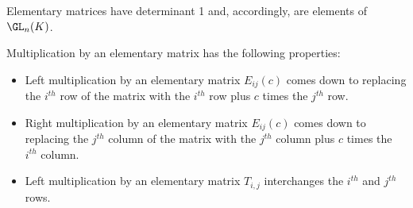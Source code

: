     \begin{property}[Invertibility]
        Elementary matrices have determinant 1 and, accordingly, are elements of $\GL_n(K)$.
    \end{property}
    \begin{property}
        Multiplication by an elementary matrix has the following properties:
        \begin{itemize}
            \item Left multiplication by an elementary matrix $E_{ij}(c)$ comes down to replacing the $i^{th}$ row of the matrix with the $i^{th}$ row plus $c$ times the $j^{th}$ row.
            \item Right multiplication by an elementary matrix $E_{ij}(c)$ comes down to replacing the $j^{th}$ column of the matrix with the $j^{th}$ column plus $c$ times the $i^{th}$ column.
            \item Left multiplication by an elementary matrix $T_{i,j}$ interchanges the $i^{th}$ and $j^{th}$ rows.
        \end{itemize}
    \end{property}

